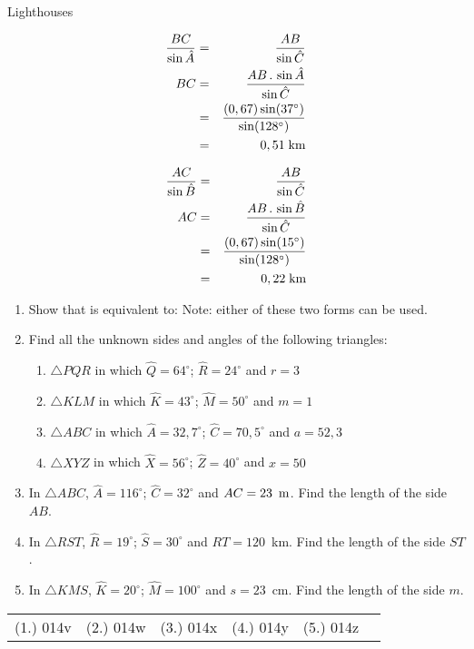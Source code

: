 \begin{wex}{Lighthouses}
{\begin{eqnarray*}
\frac{BC}{\sin \hat{A}}&=&\frac{AB}{\sin \hat{C}}\\
BC&=&\frac{AB\,.\, \sin \hat{A}}{\sin \hat{C}}\\
&=&\frac{(0,67) \sin(37^\circ)}{\sin(128^\circ)}\\
&=&0,51\;\rm{km}
\end{eqnarray*}

\begin{eqnarray*}
\frac{AC}{\sin \hat{B}}&=&\frac{AB}{\sin \hat{C}}\\
AC&=&\frac{AB\,.\, \sin \hat{B}}{\sin \hat{C}}\\
&=&\frac{(0,67) \sin(15^\circ)}{\sin(128^\circ)}\\
&=&0,22\;\rm{km}
\end{eqnarray*}

}
\end{wex}

{
\begin{enumerate}
\item Show that
is equivalent to:
Note: either of these two forms can be used.
\item Find all the unknown sides and angles of the following triangles:
	\begin{enumerate}
	\item $\triangle PQR$ in which $\hat{Q} = 64^\circ$; $\hat{R} = 24^\circ$ and $r=3$
	\item $\triangle KLM$ in which $\hat{K} = 43^\circ$; $\hat{M} = 50^\circ$ and $m=1$
	\item $\triangle ABC$ in which $\hat{A} = 32,7^\circ$; $\hat{C} = 70,5^\circ$ and $a=52,3$
	\item $\triangle XYZ$ in which $\hat{X} = 56^\circ$; $\hat{Z} = 40^\circ$ and $x=50$
	\end{enumerate}
\item In $\triangle ABC$, $\hat{A} = 116^\circ$;  $\hat{C} = 32^\circ$ and $AC = 23~\,\rm{m}$. Find the length of the side $AB$.
\item In $\triangle RST$, $\hat{R} = 19^\circ$;  $\hat{S} = 30^\circ$ and $RT = 120$~km. Find the length of the side $ST$.
\item In $\triangle KMS$, $\hat{K} = 20^\circ$;  $\hat{M} = 100^\circ$ and $s = 23$~cm. Find the length of the side $m$.
\end{enumerate}


\par \practiceinfo
\par \begin{tabular}[h]{cccccc}
(1.)	014v	&
(2.)	014w	&
(3.)	014x	&
(4.)	014y	&
(5.)	014z	&
\end{tabular}}

